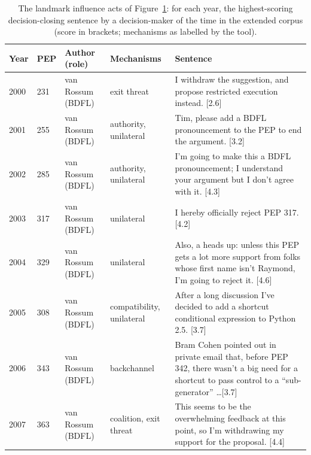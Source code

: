 \documentclass[sigconf,screen]{acmart}
\begin{document}
\begin{figure}[t]
\label{fig:timeline2}
\end{figure}

\begin{table}[t]
\caption{The landmark influence acts of Figure~\ref{fig:timeline2}: for each year, the highest-scoring decision-closing sentence by a decision-maker of the time in the extended corpus (score in brackets; mechanisms as labelled by the tool).}
\label{tab:landmarks}
\footnotesize
\begin{tabular}{p{}p{}p{}p{}p{}}
\toprule
Year & PEP & Author (role) & Mechanisms & Sentence \\
\midrule
2000 & 231 & van Rossum (BDFL) & exit threat & I withdraw the suggestion, and propose restricted execution instead. [2.6] \\
2001 & 255 & van Rossum (BDFL) & authority, unilateral & Tim, please add a BDFL pronouncement to the PEP to end the argument. [3.2] \\
2002 & 285 & van Rossum (BDFL) & authority, unilateral & I'm going to make this a BDFL pronouncement; I understand your argument but I don't agree with it. [4.3] \\
2003 & 317 & van Rossum (BDFL) & unilateral & I hereby officially reject PEP 317. [4.2] \\
2004 & 329 & van Rossum (BDFL) & unilateral & Also, a heads up: unless this PEP gets a lot more support from folks whose first name isn't Raymond, I'm going to reject it. [4.6] \\
2005 & 308 & van Rossum (BDFL) & compatibility, unilateral & After a long discussion I've decided to add a shortcut conditional expression to Python 2.5. [3.7] \\
2006 & 343 & van Rossum (BDFL) & backchannel & Bram Cohen pointed out in private email that, before PEP 342, there wasn't a big need for a shortcut to pass control to a ``sub-generator'' \ldots [3.7] \\
2007 & 363 & van Rossum (BDFL) & coalition, exit threat & This seems to be the overwhelming feedback at this point, so I'm withdrawing my support for the proposal. [4.4] \\

\end{tabular}
\end{table}
\end{document}
